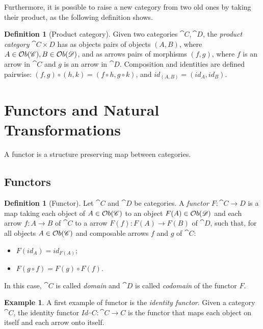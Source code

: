 \documentclass[a4paper, twoside,openright]{report}
\theoremstyle{plain}
\theoremstyle{definition}
\newtheorem{definition}[theorem]{Definition}
\newtheorem{example}[theorem]{Example}
\begin{document}
Furthermore, it is possible to raise a new category from two old ones by taking their product, as the following definition shows.

\begin{definition}[Product category]
    Given two categories $\cat C, \cat D$, the \emph{product category} $\cat{C\times D}$ has as objects pairs of objects $(A, B)$, where $A \in \mathcal{O}b(\mathscr{C}), B \in \mathcal{O}b(\mathscr{D})$, and as arrows pairs of morphisms $(f, g)$, where $f$ is an arrow in $\cat C$ and $g$ is an arrow in $\cat D$. Composition and identities are defined pairwise: $(f, g) \circ (h, k) = (f \circ h, g \circ k)$, and $id_{(A, B)} = (id_A, id_B)$.

\end{definition}

\section{Functors and Natural Transformations}\label{sect:funct_nats}

A functor is a structure preserving map between categories. 

\subsection{Functors}
\begin{definition}[Functor]
    Let $\cat{C}$ and $\cat{D}$ be categories. A \emph{functor} $F:\cat{C \rightarrow D}$ is a map taking each object of $A \in \mathcal{O}b(\mathscr{C})$ to an object $F(A) \in \mathcal{O}b(\mathscr{D})$ and each arrow $f:A\rightarrow B$ of $\cat C$ to a arrow $F(f): F(A) \rightarrow F(B)$ of $\cat D$, such that, for all objects $A \in \mathcal{O}b(\mathscr{C})$ and composable arrows $f$ and $g$ of $\cat C$:
    \begin{itemize}
        \item $F(id_{A}) = id_{F(A)}$;
        \item $F(g \circ f) = F(g) \circ F(f)$.
    \end{itemize}

    In this case, $\cat C$ is called \emph{domain} and $\cat D$ is called \emph{codomain} of the functor $F$.
\end{definition}

\begin{example}
    A first example of functor is the \emph{identity functor}. Given a category $\cat C$, the identity functor $Id_\cat C :\cat{C \rightarrow C}$ is the functor that maps each object on itself and each arrow onto itself. 
\end{example}
\end{document}
